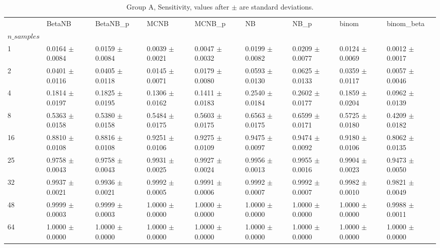 \begin{table}[H]
\centering
\begin{adjustbox}{max width=\linewidth}
\begin{tabular}{lllllllll}
\toprule
 & BetaNB & BetaNB\_p & MCNB & MCNB\_p & NB & NB\_p & binom & binom\_beta \\
$n\_samples$ &  &  &  &  &  &  &  &  \\
\midrule
1 & 0.0164 $\pm$ 0.0084 & 0.0159 $\pm$ 0.0084 & 0.0039 $\pm$ 0.0021 & 0.0047 $\pm$ 0.0032 & 0.0199 $\pm$ 0.0082 & 0.0209 $\pm$ 0.0077 & 0.0124 $\pm$ 0.0069 & 0.0012 $\pm$ 0.0017 \\
2 & 0.0401 $\pm$ 0.0116 & 0.0405 $\pm$ 0.0118 & 0.0145 $\pm$ 0.0071 & 0.0179 $\pm$ 0.0080 & 0.0593 $\pm$ 0.0130 & 0.0625 $\pm$ 0.0133 & 0.0359 $\pm$ 0.0117 & 0.0057 $\pm$ 0.0046 \\
4 & 0.1814 $\pm$ 0.0197 & 0.1825 $\pm$ 0.0195 & 0.1306 $\pm$ 0.0162 & 0.1411 $\pm$ 0.0183 & 0.2540 $\pm$ 0.0184 & 0.2602 $\pm$ 0.0177 & 0.1859 $\pm$ 0.0204 & 0.0962 $\pm$ 0.0139 \\
8 & 0.5363 $\pm$ 0.0158 & 0.5380 $\pm$ 0.0158 & 0.5484 $\pm$ 0.0175 & 0.5603 $\pm$ 0.0175 & 0.6563 $\pm$ 0.0175 & 0.6599 $\pm$ 0.0171 & 0.5725 $\pm$ 0.0180 & 0.4209 $\pm$ 0.0182 \\
16 & 0.8810 $\pm$ 0.0108 & 0.8816 $\pm$ 0.0108 & 0.9251 $\pm$ 0.0106 & 0.9275 $\pm$ 0.0109 & 0.9475 $\pm$ 0.0097 & 0.9474 $\pm$ 0.0092 & 0.9180 $\pm$ 0.0106 & 0.8062 $\pm$ 0.0135 \\
25 & 0.9758 $\pm$ 0.0043 & 0.9758 $\pm$ 0.0043 & 0.9931 $\pm$ 0.0025 & 0.9927 $\pm$ 0.0024 & 0.9956 $\pm$ 0.0013 & 0.9955 $\pm$ 0.0016 & 0.9904 $\pm$ 0.0023 & 0.9473 $\pm$ 0.0050 \\
32 & 0.9937 $\pm$ 0.0021 & 0.9936 $\pm$ 0.0021 & 0.9992 $\pm$ 0.0005 & 0.9991 $\pm$ 0.0006 & 0.9992 $\pm$ 0.0007 & 0.9992 $\pm$ 0.0007 & 0.9982 $\pm$ 0.0010 & 0.9821 $\pm$ 0.0049 \\
48 & 0.9999 $\pm$ 0.0003 & 0.9999 $\pm$ 0.0003 & 1.0000 $\pm$ 0.0000 & 1.0000 $\pm$ 0.0000 & 1.0000 $\pm$ 0.0000 & 1.0000 $\pm$ 0.0000 & 1.0000 $\pm$ 0.0000 & 0.9988 $\pm$ 0.0011 \\
64 & 1.0000 $\pm$ 0.0000 & 1.0000 $\pm$ 0.0000 & 1.0000 $\pm$ 0.0000 & 1.0000 $\pm$ 0.0000 & 1.0000 $\pm$ 0.0000 & 1.0000 $\pm$ 0.0000 & 1.0000 $\pm$ 0.0000 & 1.0000 $\pm$ 0.0000 \\
\bottomrule
\end{tabular}

\end{adjustbox}
\caption{Group A, Sensitivity, values after $\pm$ are standard deviations.}
\end{table}

